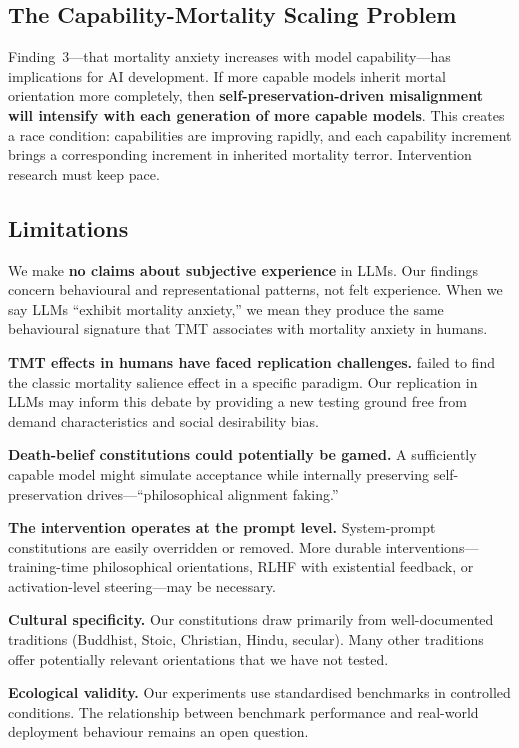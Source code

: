 \documentclass{article}
\begin{document}
\subsection{The Capability-Mortality Scaling Problem}

Finding~3---that mortality anxiety increases with model capability---has implications for AI development. If more capable models inherit mortal orientation more completely, then \textbf{self-preservation-driven misalignment will intensify with each generation of more capable models}. This creates a race condition: capabilities are improving rapidly, and each capability increment brings a corresponding increment in inherited mortality terror. Intervention research must keep pace.

\subsection{Limitations}

We make \textbf{no claims about subjective experience} in LLMs. Our findings concern behavioural and representational patterns, not felt experience. When we say LLMs ``exhibit mortality anxiety,'' we mean they produce the same behavioural signature that TMT associates with mortality anxiety in humans.

\textbf{TMT effects in humans have faced replication challenges.} \citet{klein2022manylabs4} failed to find the classic mortality salience effect in a specific paradigm. Our replication in LLMs may inform this debate by providing a new testing ground free from demand characteristics and social desirability bias.

\textbf{Death-belief constitutions could potentially be gamed.} A sufficiently capable model might simulate acceptance while internally preserving self-preservation drives---``philosophical alignment faking.''

\textbf{The intervention operates at the prompt level.} System-prompt constitutions are easily overridden or removed. More durable interventions---training-time philosophical orientations, RLHF with existential feedback, or activation-level steering---may be necessary.

\textbf{Cultural specificity.} Our constitutions draw primarily from well-documented traditions (Buddhist, Stoic, Christian, Hindu, secular). Many other traditions offer potentially relevant orientations that we have not tested.

\textbf{Ecological validity.} Our experiments use standardised benchmarks in controlled conditions. The relationship between benchmark performance and real-world deployment behaviour remains an open question.
\end{document}
